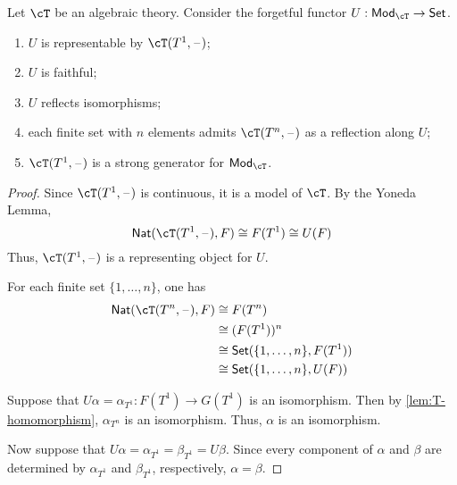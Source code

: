 \documentclass{amsart}
\begin{document}
\begin{lem}
  Let $\cT$ be an algebraic theory.
  Consider the forgetful functor $U : \mathsf{Mod}_{\cT} \to \mathsf{Set}$.
  \begin{enumerate}
  \item $U$ is representable by $\cT(T^{1}, \blank)$;
  \item $U$ is faithful;
  \item $U$ reflects isomorphisms;
  \item each finite set with $n$ elements admits $\cT(T^{n}, \blank)$ as a reflection along $U$;
  \item $\cT(T^{1}, \blank)$ is a strong generator for $\mathsf{Mod}_{\cT}$.
  \end{enumerate}
\end{lem}
\begin{proof}
  Since $\cT(T^{1},\blank)$ is continuous, it is a model of $\cT$.
  By the Yoneda Lemma,
  \[
    \mathsf{Nat}(\cT(T^{1}, \blank), F) \iso F(T^{1}) \iso U(F)
  \]
  Thus, $\cT(T^{1},\blank)$ is a representing object for $U$.

  For each finite set $\{1,\ldots,n\}$, one has
  \begin{align}
    \mathsf{Nat}(\cT(T^{n},\blank), F) &\iso F(T^{n})\\
                                       &\iso (F(T^{1}))^{n}\\
                                       &\iso \mathsf{Set}(\{1,\ldots,n\}, F(T^{1}))\\
                                       &\iso \mathsf{Set}(\{1,\ldots,n\}, U(F))
  \end{align}

  Suppose that $U\alpha = \alpha_{T^{1}} : F(T^{1}) \to G(T^{1})$ is an isomorphism.
  Then by \cref{lem:T-homomorphism}, $\alpha_{T^{n}}$ is an isomorphism.
  Thus, $\alpha$ is an isomorphism.

  Now suppose that $U\alpha = \alpha_{T^{1}} = \beta_{T^{1}} = U\beta$.
  Since every component of $\alpha$ and $\beta$ are determined by $\alpha_{T^{1}}$ and $\beta_{T^{1}}$, respectively, $\alpha = \beta$.
\end{proof}
\end{document}
